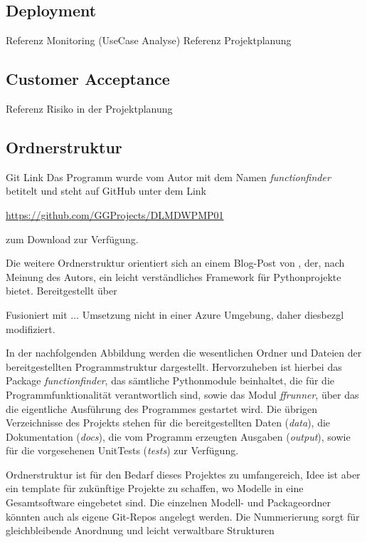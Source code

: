 \subsection{Deployment}
Referenz Monitoring (UseCase Analyse)
Referenz Projektplanung

\subsection{Customer Acceptance}
Referenz Risiko in der Projektplanung

\subsection{Ordnerstruktur}

Git Link
Das Programm wurde vom Autor mit dem Namen \emph{\glqq functionfinder\grqq} betitelt und steht auf GitHub unter dem Link \begin{center}\url{https://github.com/GGProjects/DLMDWPMP01}\end{center} zum Download zur Verfügung.

 Die weitere Ordnerstruktur orientiert sich an einem Blog-Post von \cite{henk_griffioen_how_2017}, der, nach Meinung des Autors, ein leicht verständliches Framework für Pythonprojekte bietet. Bereitgestellt über \citep{griffioen_hgrifexample-project_2023}

Fusioniert mit \citep{noauthor_azureazure-tdsp-projecttemplate_2025} \colorbox{hellrot}{...}
Umsetzung nicht in einer Azure Umgebung, daher diesbezgl modifiziert.



In der nachfolgenden Abbildung werden die wesentlichen Ordner und Dateien der bereitgestellten Programmstruktur dargestellt. Hervorzuheben ist hierbei das Package \emph{functionfinder}, das sämtliche Pythonmodule beinhaltet, die für die Programmfunktionalität verantwortlich sind, sowie das Modul \emph{ffrunner}, über das die eigentliche Ausführung des Programmes gestartet wird.
Die übrigen Verzeichnisse des Projekts stehen für die bereitgestellten Daten (\emph{data}), die Dokumentation (\emph{docs}), die vom Programm erzeugten Ausgaben (\emph{output}), sowie für die vorgesehenen UnitTests (\emph{tests}) zur Verfügung.

Ordnerstruktur ist für den Bedarf dieses Projektes zu umfangereich, Idee ist aber ein template für zukünftige Projekte zu schaffen, wo Modelle in eine Gesamtsoftware eingebetet sind. Die einzelnen Modell- und Packageordner könnten auch als eigene Git-Repos angelegt werden. Die Nummerierung sorgt für gleichbleibende Anordnung und leicht verwaltbare Strukturen

